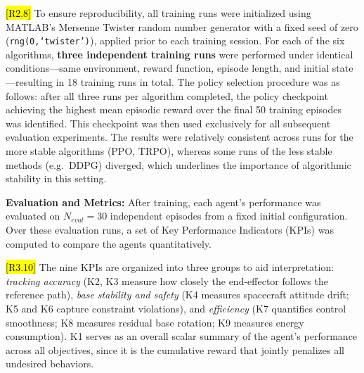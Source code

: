 \documentclass{ieeeaccess}
\newcommand{\hltwo}[1]{{\sethlcolor{rtwo}\hl{#1}}}
\newenvironment{rtwohl}
  {\def\FrameCommand{\colorbox{rtwo}}\MakeFramed{\advance\hsize-\width\FrameRestore}}
  {\endMakeFramed}
\newcommand{\hlthree}[1]{{\sethlcolor{rthree}\hl{#1}}}
\newenvironment{rthreehl}
  {\def\FrameCommand{\colorbox{rthree}}\MakeFramed{\advance\hsize-\width\FrameRestore}}
  {\endMakeFramed}
\begin{document}
\begin{rtwohl}
\hltwo{[R2.8]} To ensure reproducibility, all training runs were initialized using MATLAB's Mersenne Twister random number generator with a fixed seed of zero (\texttt{rng(0,`twister')}), applied prior to each training session. For each of the six algorithms, \textbf{three independent training runs} were performed under identical conditions---same environment, reward function, episode length, and initial state---resulting in 18 training runs in total. The policy selection procedure was as follows: after all three runs per algorithm completed, the policy checkpoint achieving the highest mean episodic reward over the final 50 training episodes was identified. This checkpoint was then used exclusively for all subsequent evaluation experiments. The results were relatively consistent across runs for the more stable algorithms (PPO, TRPO), whereas some runs of the less stable methods (e.g.\ DDPG) diverged, which underlines the importance of algorithmic stability in this setting.
\end{rtwohl}

\textbf{Evaluation and Metrics:} After training, each agent's performance was evaluated on $N_{eval}
= 30$ independent episodes from a fixed initial configuration. Over these
evaluation runs, a set of Key Performance Indicators (KPIs) was computed to compare the
agents quantitatively.

\begin{rthreehl}
\hlthree{[R3.10]} The nine KPIs are organized into three groups to aid interpretation: \emph{tracking accuracy} (K2, K3 measure how closely the end-effector follows the reference path), \emph{base stability and safety} (K4 measures spacecraft attitude drift; K5 and K6 capture constraint violations), and \emph{efficiency} (K7 quantifies control smoothness; K8 measures residual base rotation; K9 measures energy consumption). K1 serves as an overall scalar summary of the agent’s performance across all objectives, since it is the cumulative reward that jointly penalizes all undesired behaviors.
\end{rthreehl}
\end{document}
